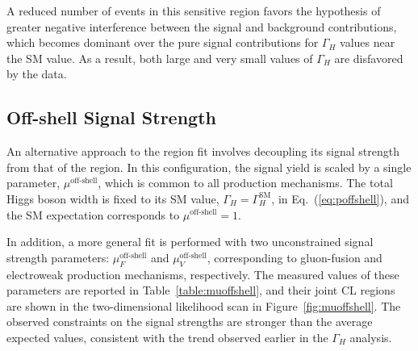 A reduced number of events in this sensitive region favors the hypothesis of greater negative interference between the signal and background contributions, which becomes dominant over the pure signal contributions for $\Gamma_H$ values near the SM value. As a result, both large and very small values of $\Gamma_H$ are disfavored by the data.

\subsection{Off-shell Signal Strength}


An alternative approach to the \offshell region fit involves decoupling its signal strength from that of the \onshell region. In this configuration, the signal yield is scaled by a single parameter, $\mu^\text{off-shell}$, which is common to all production mechanisms. The total Higgs boson width is fixed to its SM value, $\Gamma_H = \Gamma_H^{\mathrm{SM}}$, in Eq.~(\ref{eq:poffshell}), and the SM expectation corresponds to $\mu^\text{off-shell} = 1$.

In addition, a more general fit is performed with two unconstrained signal strength parameters: $\mu^\text{off-shell}_{F}$ and $\mu^\text{off-shell}_{V}$, corresponding to gluon-fusion and electroweak production mechanisms, respectively. The measured values of these parameters are reported in Table~\ref{table:muoffshell}, and their joint CL regions are shown in the two-dimensional likelihood scan in Figure~\ref{fig:muoffshell}. The observed constraints on the \offshell signal strengths are stronger than the average expected values, consistent with the trend observed earlier in the $\Gamma_H$ analysis.

